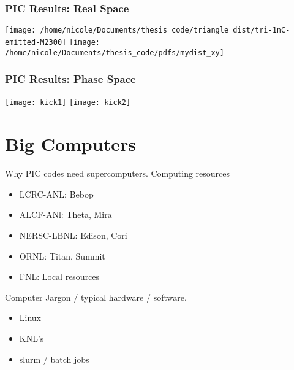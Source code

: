 \documentclass[professionalfonts,t]{beamer}
\begin{document}
\begin{frame}
	\frametitle{PIC Results: Real Space}
	\vspace{1em}
	\texttt{[image: /home/nicole/Documents/thesis\_code/triangle\_dist/tri-1nC-emitted-M2300]}
	\texttt{[image: /home/nicole/Documents/thesis\_code/pdfs/mydist\_xy]}
\end{frame}

\begin{frame}
	\frametitle{PIC Results: Phase Space}
	\vspace{2em}
	\texttt{[image: kick1]}
	\texttt{[image: kick2]}
\end{frame}



\section{Big Computers}
\begin{frame}
Why PIC codes need supercomputers.
Computing resources
\begin{itemize}
	\item LCRC-ANL: Bebop
	\item ALCF-ANl: Theta, Mira
	\item NERSC-LBNL: Edison, Cori
	\item ORNL: Titan, Summit
	\item FNL: Local resources
\end{itemize}
\end{frame}

\begin{frame}
	Computer Jargon / typical hardware / software.
	\begin{itemize}
		\item Linux
		\item KNL's
		\item slurm / batch jobs
	\end{itemize}
\end{frame}
\end{document}
